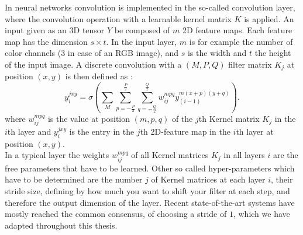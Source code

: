 In neural networks convolution is implemented in the so-called convolution layer, where the convolution operation with a learnable kernel matrix $K$ is applied. An input given as an 3D tensor $Y$ be composed of $m$ 2D feature maps. Each feature map has the dimension $s \times t$. In the input layer, $m$ is for example the number of color channels (3 in case of an RGB image), and $s$ is the width and $t$ the height of the input image. A discrete convolution with a $(M , P , Q)$ filter matrix $K_j$ at position $(x,y)$ is then defined as : 
\[
y_{i}^{jxy} = \sigma(\sum_M \sum_{p=-\frac{P}{2}}^{\frac{P}{2}} \sum_{q=-\frac{Q}{2}}^{\frac{Q}{2}} w_{ij}^{mpq} y_{(i-1)}^{m(x+p)(y+q)}) .
\]
where $w_{ij}^{mpq}$ is the value at position $(m,p,q)$ of the $j$th Kernel matrix $K_j$ in the $i$th layer and $y_{i}^{jxy}$ is the entry in the $j$th 2D-feature map in the $i$th layer at position $(x, y)$.\\
In a typical layer the weights $w_{ij}^{mpq}$ of all Kernel matrices $K_j$ in all layers $i$ are the free parameters that have to be learned. Other so called hyper-parameters which have to be determined are the number $j$ of Kernel matrices at each layer $i$, their stride size, defining by how much you want to shift your filter at each step, and therefore the output dimension of the layer.
Recent state-of-the-art systems have mostly reached the common consensus, of choosing a stride of $1$, which we have adapted throughout this thesis.




